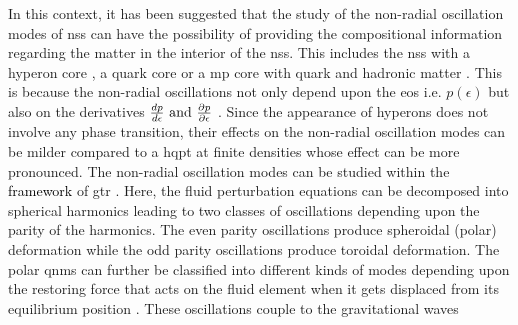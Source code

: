 \documentclass[a4paper, 11pt]{article}
\newcommand{\magenta}[1]{\textcolor{black}{#1}}
\begin{document}
In this context, it has been suggested that the study of the non-radial oscillation modes of \ac{ns}s can have 
the possibility of providing the compositional information regarding the matter in the interior of the \ac{ns}s.
 This includes the \ac{ns}s with a hyperon core \cite{Dommes:2015, Yu:2016ltf, Pradhan:2020}, a quark core or a 
\ac{mp} core with quark and hadronic matter 
\cite{Sotani:2010, Flores:2013, Brillante:2014, Sandoval:2018, Wei:2018, Rodriguez:2020, Lau:2020}.
 This is because the non-radial oscillations not only depend upon the \ac{eos} i.e. $p(\epsilon)$ but also on
 the derivatives $\frac{dp}{d\epsilon} {\rm ~and~} \frac{\partial p}{\partial \epsilon}$ \cite{Jaikumar:2021jbw}.
 Since the appearance of hyperons does not involve any phase transition, their effects on the non-radial oscillation
 modes can be milder compared to a \ac{hqpt} at finite densities whose effect can be more pronounced.
 The non-radial oscillation modes can be studied within the \magenta{framework} of \ac{gtr} \cite{Thorne:1967, Detweiler:1985}.
 Here, the fluid perturbation equations can be decomposed into spherical harmonics leading to two classes of 
oscillations depending upon the parity of the harmonics. The even parity oscillations produce spheroidal (polar) 
deformation while the odd parity oscillations produce toroidal deformation. The polar \ac{qnm}s can further be 
classified into different kinds of modes depending upon the restoring force that acts on the fluid element when it 
gets displaced from its equilibrium position \cite{Kokkotas:1999}. These oscillations couple to the gravitational waves
\end{document}
